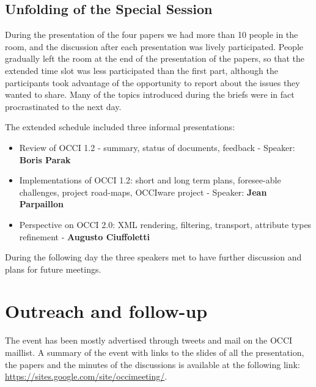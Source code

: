 \documentclass[10pt,a4paper]{article}
\begin{document}
\subsection{Unfolding of the Special Session}

During the presentation of the four papers we had more than 10 people in the room, and the discussion after each presentation was lively participated. People gradually left the room at the end of the presentation of the papers, so that the extended time slot was less participated than the first part, although the participants took advantage of the opportunity to report about the issues they wanted to share. Many of the topics introduced during the briefs were in fact procrastinated to the next day.

The extended schedule included three informal presentations:

\begin{itemize}
\item Review of OCCI 1.2 - summary, status of documents, feedback - Speaker: {\bf Boris Parak}
\item Implementations of OCCI 1.2: short and long term plans, foresee-able challenges, project road-maps, OCCIware project - Speaker: {\bf Jean Parpaillon}
\item Perspective on OCCI 2.0: XML rendering, filtering, transport, attribute types refinement - {\bf Augusto Ciuffoletti}
\end{itemize}

During the following day the three speakers met to have further discussion and plans for future meetings.

\section{Outreach and follow-up}

The event has been mostly advertised through tweets and mail on the OCCI maillist. A summary of the event with links to the slides of all the presentation, the papers and the minutes of the discussions is available at the following link:\\ \href{https://sites.google.com/site/occimeeting/}{https://sites.google.com/site/occimeeting/}.


\end{document}
